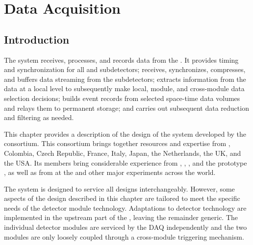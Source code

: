 \chapter{Data Acquisition}
\label{ch:daq}

\section{Introduction}
\label{sec:daq:introduction}

The   system receives,
processes, and records data from the  .
It provides
timing and synchronization for all  and
subdetectors; receives, synchronizes, compresses, and buffers data
streaming from the subdetectors; extracts information from the data at a
local level to subsequently make local, module, and cross-module data
selection decisions; builds event records
from selected space-time data volumes 
and relays them to permanent storage; and carries out subsequent data
reduction and filtering as needed.

This chapter provides a description of the design of the 
  system developed by the  
 consortium. 
This consortium brings together resources and expertise from ,
Colombia, Czech Republic, France, Italy, Japan, the Netherlands, the UK, and the USA. 
Its members bring considerable experience from , ,
, and the
 prototype , as well as from  at the  and other major
 experiments across the world.

The system is designed to service all   designs
interchangeably.  However, some aspects of the  design described in
this chapter are tailored to meet the specific needs of the 
detector module technology.  Adaptations to detector technology are
implemented in the upstream part of the , leaving the remainder generic. The
individual detector modules are serviced by the DAQ independently and the two modules are only loosely
coupled through a cross-module triggering mechanism.

